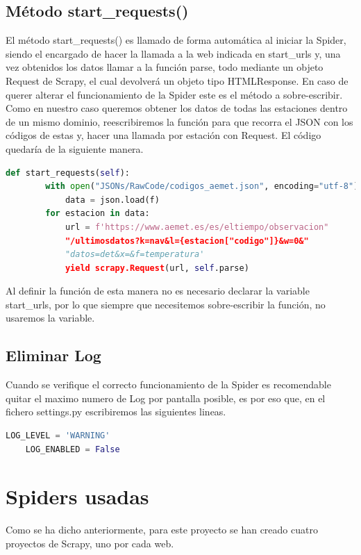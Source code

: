 \subsection{Método start\_requests()}
El método start\_requests() es llamado de forma automática al iniciar la Spider, siendo el encargado de hacer la llamada a la web indicada en start\_urls y, una vez obtenidos los datos llamar a la función parse, todo mediante un objeto Request de Scrapy, el cual devolverá un objeto tipo HTMLResponse. En caso de querer alterar el funcionamiento de la Spider este es el método a sobre-escribir.\newline
\newline
Como en nuestro caso queremos obtener los datos de todas las estaciones dentro de un mismo dominio, reescribiremos la función para que recorra el JSON con los códigos de estas y, hacer una llamada por estación con Request.\newline
\newline
El código quedaría de la siguiente manera.

\begin{lstlisting}[language=Python, caption={Sobre-escritura de start\_request()}]
	def start_requests(self):
		with open("JSONs/RawCode/codigos_aemet.json", encoding="utf-8") as f:
			data = json.load(f)
		for estacion in data:
			url = f'https://www.aemet.es/es/eltiempo/observacion"
			"/ultimosdatos?k=nav&l={estacion["codigo"]}&w=0&"
			"datos=det&x=&f=temperatura'
			yield scrapy.Request(url, self.parse)
\end{lstlisting}

Al definir la función de esta manera no es necesario declarar la variable start\_urls, por lo que siempre que necesitemos sobre-escribir la función, no usaremos la variable.

\subsection{Eliminar Log}
Cuando se verifique el correcto funcionamiento de la Spider es recomendable quitar el maximo numero de Log por pantalla posible, es por eso que, en el fichero settings.py escribiremos las siguientes lineas.

\begin{lstlisting}[language=Python, caption={Configurar LOG}]
	LOG_LEVEL = 'WARNING'
	LOG_ENABLED = False
\end{lstlisting}

\section{Spiders usadas}
Como se ha dicho anteriormente, para este proyecto se han creado cuatro proyectos de Scrapy, uno por cada web.

